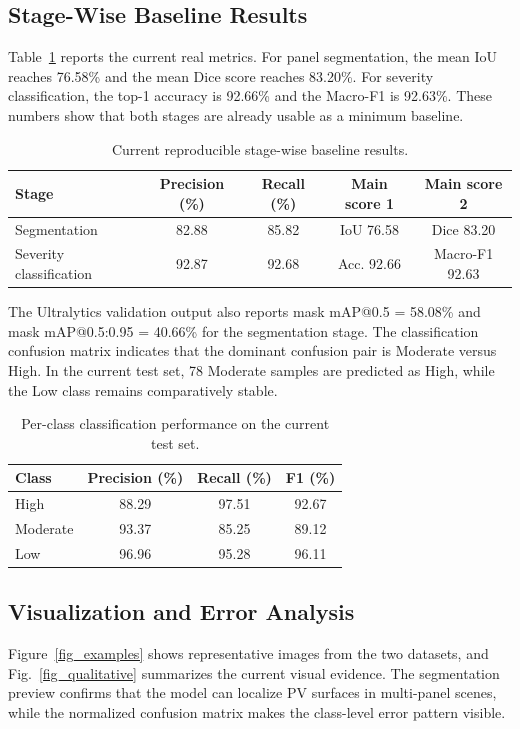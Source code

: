 \documentclass[conference]{IEEEtran}
\newcommand{\SegIoU}{76.58}
\newcommand{\SegDice}{83.20}
\newcommand{\SegPrecision}{82.88}
\newcommand{\SegRecall}{85.82}
\newcommand{\SegMapFifty}{58.08}
\newcommand{\SegMapNinetyFive}{40.66}
\newcommand{\ClsAcc}{92.66}
\newcommand{\ClsMacroP}{92.87}
\newcommand{\ClsMacroR}{92.68}
\newcommand{\ClsMacroF}{92.63}
\begin{document}
\subsection{Stage-Wise Baseline Results}
Table~\ref{tab_stage_results} reports the current real metrics. For panel segmentation, the mean IoU reaches \SegIoU{}\% and the mean Dice score reaches \SegDice{}\%. For severity classification, the top-1 accuracy is \ClsAcc{}\% and the Macro-F1 is \ClsMacroF{}\%. These numbers show that both stages are already usable as a minimum baseline.

\begin{table}[htbp]
\caption{Current reproducible stage-wise baseline results.}
\label{tab_stage_results}
\centering
\begin{tabular}{lcccc}
\toprule
Stage & Precision (\%) & Recall (\%) & Main score 1 & Main score 2 \\
\midrule
Segmentation & \SegPrecision{} & \SegRecall{} & IoU \SegIoU{} & Dice \SegDice{} \\
Severity classification & \ClsMacroP{} & \ClsMacroR{} & Acc. \ClsAcc{} & Macro-F1 \ClsMacroF{} \\
\bottomrule
\end{tabular}
\end{table}

The Ultralytics validation output also reports mask mAP@0.5 = \SegMapFifty{}\% and mask mAP@0.5:0.95 = \SegMapNinetyFive{}\% for the segmentation stage. The classification confusion matrix indicates that the dominant confusion pair is Moderate versus High. In the current test set, 78 Moderate samples are predicted as High, while the Low class remains comparatively stable.

\begin{table}[htbp]
\caption{Per-class classification performance on the current test set.}
\label{tab_cls_perclass}
\centering
\begin{tabular}{lccc}
\toprule
Class & Precision (\%) & Recall (\%) & F1 (\%) \\
\midrule
High & 88.29 & 97.51 & 92.67 \\
Moderate & 93.37 & 85.25 & 89.12 \\
Low & 96.96 & 95.28 & 96.11 \\
\bottomrule
\end{tabular}
\end{table}

\subsection{Visualization and Error Analysis}
Figure~\ref{fig_examples} shows representative images from the two datasets, and Fig.~\ref{fig_qualitative} summarizes the current visual evidence. The segmentation preview confirms that the model can localize PV surfaces in multi-panel scenes, while the normalized confusion matrix makes the class-level error pattern visible.
\end{document}
